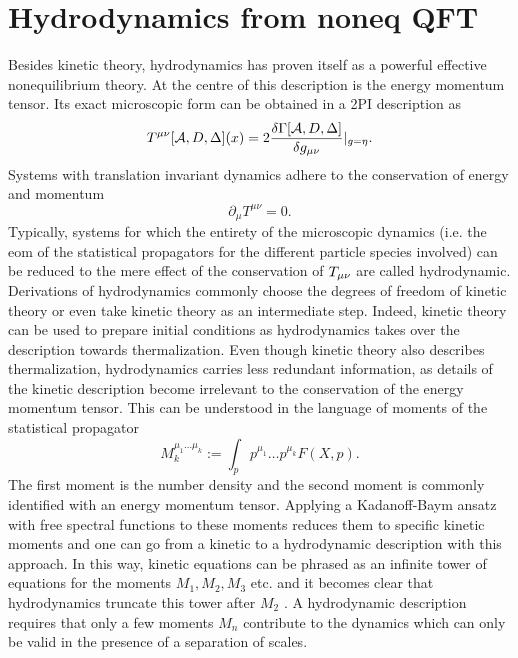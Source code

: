 \section{Hydrodynamics from noneq QFT}
Besides kinetic theory, hydrodynamics has proven itself as a powerful effective
nonequilibrium theory. At the centre of this description is the energy momentum tensor. Its exact
microscopic form can be obtained in a 2PI description as
\begin{equation}
	T^{\mu\nu} [\mathcal{A},D,\Delta](x) = 2 \frac{\delta \Gamma [\mathcal{A},D,\Delta]}{\delta g_{\mu \nu}} |_{g=\eta}.
\end{equation}
Systems with translation invariant dynamics adhere to the conservation of energy and momentum
\begin{equation}
	\partial_\mu T^{\mu \nu} =0.
\end{equation}
Typically, systems for which the entirety of the microscopic dynamics (i.e. the eom of the statistical propagators for the different particle species involved) can be reduced to the mere
effect of the conservation of $T_{\mu \nu}$ are called hydrodynamic. Derivations of hydrodynamics
commonly choose the degrees of freedom of kinetic theory or even take kinetic theory as an intermediate
step. Indeed, kinetic theory can be used to prepare initial conditions as hydrodynamics takes over the
description towards thermalization. Even though kinetic theory also describes thermalization,
hydrodynamics carries less redundant information, as details of the kinetic description become irrelevant
to the conservation of the energy momentum tensor. This can be understood in the language of moments
of the statistical propagator
\begin{equation}
M^{\mu_1 \dots \mu_k}_k := \int_p p^{\mu_1} \dots p^{\mu_k} F(X,p) .
\end{equation}
The first moment is the number density and the second moment is commonly identified with an energy
momentum tensor. Applying a Kadanoff-Baym ansatz with free spectral functions to these moments reduces them to specific kinetic moments and one
can go from a kinetic to a hydrodynamic description with this approach. In this way, kinetic equations
can be phrased as an infinite tower of equations for the moments $M_1 , M_2 , M_3$ etc. and it becomes clear
that hydrodynamics truncate this tower after $M_2$ . A hydrodynamic
description requires that only a few moments $M_n$ contribute to the dynamics which can only be valid in
the presence of a separation of scales.\\
